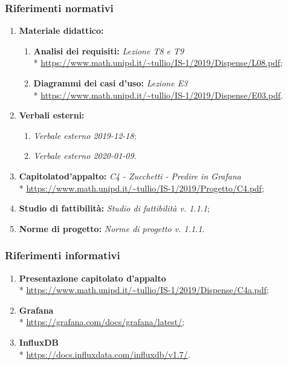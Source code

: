 		\subsubsection{Riferimenti normativi}
			\begin{enumerate}
				\item \textbf{Materiale didattico:}
				\begin{enumerate}
					\item \textbf{Analisi dei requisiti:} \textit{Lezione T8 e T9} \\*
						\url{https://www.math.unipd.it/~tullio/IS-1/2019/Dispense/L08.pdf};
					\item \textbf{Diagrammi dei casi d'uso:} \textit{Lezione E3} \\*
						\url{https://www.math.unipd.it/~tullio/IS-1/2019/Dispense/E03.pdf}.
				\end{enumerate}
				\item \textbf{Verbali esterni:} 
				\begin{enumerate}
					\item \textit{Verbale esterno 2019-12-18};
					\item \textit{Verbale esterno 2020-01-09}.
				\end{enumerate}
				\item \textbf{Capitolato\glosp d'appalto:} \textit{C4 - Zucchetti - Predire in Grafana} \\*
						\url{https://www.math.unipd.it/~tullio/IS-1/2019/Progetto/C4.pdf};
					\item \textbf{Studio di fattibilità:} \textit{Studio di fattibilità v. 1.1.1};
					\item \textbf{Norme di progetto:} \textit{Norme di progetto v. 1.1.1}.
			\end{enumerate}
		\subsubsection{Riferimenti informativi}
			\begin{enumerate}
				\item \textbf{Presentazione capitolato d'appalto} \\*
					\url{https://www.math.unipd.it/~tullio/IS-1/2019/Dispense/C4a.pdf};
				\item \textbf{Grafana} \\*
					\url{https://grafana.com/docs/grafana/latest/};
				\item \textbf{InfluxDB} \\*
					\url{https://docs.influxdata.com/influxdb/v1.7/}.
			\end{enumerate}
